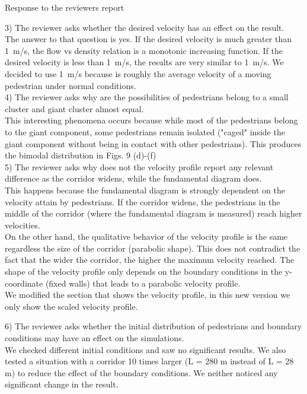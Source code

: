 \documentclass[a4paper,12pt]{letter}
\begin{document}
\begin{letter}{Response to the reviewers report}
{3) The reviewer asks whether the desired velocity has an effect on the result.\\

The answer to that question is yes. If the desired velocity is much greater than 1~m/s, the flow vs density relation is a monotonic increasing function. If the desired velocity is less than 1~m/s, the results are very similar to 1~m/s. We decided to use 1~m/s because is roughly the average velocity of a moving pedestrian under normal conditions. \\

4) The reviewer asks why are the possibilities of pedestrians belong to a small cluster and giant cluster almost equal. \\

This interesting phenomena occurs because while most of the pedestrians belong to the giant component, some pedestrians remain isolated ("caged" inside the giant component without being in contact with other pedestrians). This produces the bimodal distribution in Figs. 9 (d)-(f)\\

5) The reviewer asks why does not the velocity profile report any relevant difference as the corridor widens, while the fundamental diagram does.\\

This happens because the fundamental diagram is strongly dependent on the velocity attain by pedestrians. If the corridor widens, the pedestrians in the middle of the corridor (where the fundamental diagram is measured) reach higher velocities. \\

On the other hand, the qualitative behavior of the velocity profile is the same regardless the size of the corridor (parabolic shape). This does not contradict the fact that the wider the corridor, the higher the maximum velocity reached. The shape of the velocity profile only depends on the boundary conditions in the y-coordinate (fixed walls) that leads to a parabolic velocity profile. \\

We modified the section that shows the velocity profile, in this new version we only show the scaled velocity profile. 

6) The reviewer asks whether the initial distribution of pedestrians and boundary conditions may have an effect on the simulations.\\

We checked different initial conditions and saw no significant results. We also tested a situation with a corridor 10 times larger (L = 280 m instead of L = 28 m) to reduce the effect of the boundary conditions. We neither noticed any significant change in the result. \\

}
\end{letter}
\end{document}

